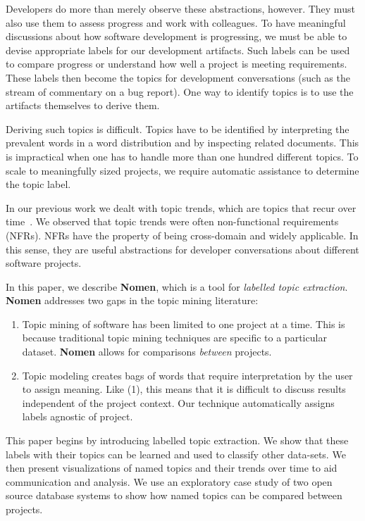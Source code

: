\documentclass[]{sig-alternate}
\begin{document}
Developers do more than merely observe these abstractions, however. They must also use them to assess progress and work with colleagues. To have meaningful discussions about how software development is progressing, we must be able to devise appropriate labels for our development artifacts. Such labels can be used to compare progress or understand how well a project is meeting requirements. These labels then become the topics for development conversations (such as the stream of commentary on a bug report). One way to identify topics is to use the artifacts themselves to derive them. 

Deriving such topics is difficult. Topics have to be identified by interpreting the prevalent words in a word distribution and by inspecting related documents. This is impractical when one has to handle more than one hundred different topics. To scale to meaningfully sized projects, we require automatic assistance to determine the topic label.

In our previous work we dealt with topic trends, which are topics that recur over time~\cite{Hindle09ICSM}. We observed that topic trends were often non-functional requirements (NFRs). NFRs have the property of being cross-domain and widely applicable. In this sense, they are useful abstractions for developer conversations about different software projects.

In this paper, we describe \textbf{Nomen}, which is a tool for \emph{labelled topic extraction}. \textbf{Nomen} addresses two gaps in the topic mining literature:
\begin{enumerate}
  \item Topic mining of software has been limited to one project at a time. This is because traditional topic mining techniques are specific to a particular dataset. \textbf{Nomen} allows for comparisons \textit{between} projects. 
  \item Topic modeling creates bags of words that require interpretation by the user to assign meaning. Like (1), this means
that it is difficult to discuss results independent of the project context. Our technique automatically assigns labels agnostic of project.
\end{enumerate}

This paper begins by introducing labelled topic extraction. We show that these labels with their topics can be learned and used to classify other data-sets. We then present visualizations of named topics and their trends over time to aid communication and analysis. We use an exploratory case study of two open source database systems to show how named topics can be compared between projects.
\end{document}
